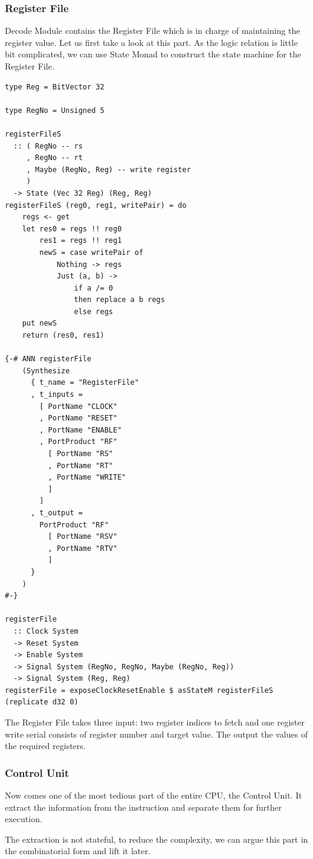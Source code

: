 \documentclass[a4paper,12pt, oneside]{book}
\begin{document}
\subsubsection{Register File}
Decode Module contains the Register File which is in charge of maintaining the register value. Let us first take a look at this part.
As the logic relation is little bit complicated, we can use State Monad to construct the state machine for the Register File.
\begin{verbatim}
type Reg = BitVector 32

type RegNo = Unsigned 5

registerFileS 
  :: ( RegNo -- rs
     , RegNo -- rt
     , Maybe (RegNo, Reg) -- write register
     )
  -> State (Vec 32 Reg) (Reg, Reg)
registerFileS (reg0, reg1, writePair) = do
    regs <- get
    let res0 = regs !! reg0
        res1 = regs !! reg1
        newS = case writePair of
            Nothing -> regs
            Just (a, b) -> 
                if a /= 0
                then replace a b regs
                else regs
    put newS
    return (res0, res1)

{-# ANN registerFile
    (Synthesize
      { t_name = "RegisterFile"
      , t_inputs =
        [ PortName "CLOCK"
        , PortName "RESET"
        , PortName "ENABLE"
        , PortProduct "RF" 
          [ PortName "RS"
          , PortName "RT"
          , PortName "WRITE"
          ]
        ]
      , t_output = 
        PortProduct "RF" 
          [ PortName "RSV"
          , PortName "RTV"
          ]
      }
    )
#-}

registerFile 
  :: Clock System
  -> Reset System
  -> Enable System
  -> Signal System (RegNo, RegNo, Maybe (RegNo, Reg))
  -> Signal System (Reg, Reg)
registerFile = exposeClockResetEnable $ asStateM registerFileS (replicate d32 0)
\end{verbatim}
The Register File takes three input: two register indices to fetch and one register write serial consists of register number and target value. The output the values of the required registers.

\subsubsection{Control Unit}
Now comes one of the most tedious part of the entire CPU, the Control Unit. It extract the information from the instruction and separate them for further execution.

The extraction is not stateful, to reduce the complexity, we can argue this part in the combinatorial form and lift it later. 
\end{document}
